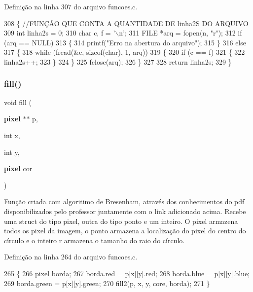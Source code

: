 Definição na linha 307 do arquivo funcoes.\+c.


\begin{DoxyCode}
308 \{ \textcolor{comment}{//FUNÇÃO QUE CONTA A QUANTIDADE DE linha2S DO ARQUIVO}
309     \textcolor{keywordtype}{int} linha2s = 0;
310     \textcolor{keywordtype}{char} c, f = \textcolor{charliteral}{'\(\backslash\)n'};
311     FILE *arq = fopen(n, \textcolor{stringliteral}{"r"});
312     \textcolor{keywordflow}{if} (arq == NULL)
313     \{
314         printf(\textcolor{stringliteral}{"Erro na abertura do arquivo"});
315     \}
316     \textcolor{keywordflow}{else}
317     \{
318         \textcolor{keywordflow}{while} (fread(&c, \textcolor{keyword}{sizeof}(\textcolor{keywordtype}{char}), 1, arq))
319         \{
320             \textcolor{keywordflow}{if} (c == f)
321             \{
322                 linha2s++;
323             \}
324         \}
325         fclose(arq);
326     \}
327 
328     \textcolor{keywordflow}{return} linha2s;
329 \}
\end{DoxyCode}
\mbox{\label{funcoes_8h_a0bd7c472a897af20e56c8d5483436282}} 
\subsubsection{fill()}
{\footnotesize\ttfamily void fill (\begin{DoxyParamCaption}\item[{\textbf{ pixel} $\ast$$\ast$}]{p,  }\item[{int}]{x,  }\item[{int}]{y,  }\item[{\textbf{ pixel}}]{cor }\end{DoxyParamCaption})}



Função criada com algoritimo de Bresenham, através dos conhecimentos do pdf disponibilizados pelo professor juntamente com o link adicionado acima. Recebe uma struct do tipo pixel, outra do tipo ponto e um inteiro. O pixel armazena todos os pixel da imagem, o ponto armazena a localização do pixel do centro do círculo e o inteiro r armazena o tamanho do raio do círculo. 



Definição na linha 264 do arquivo funcoes.\+c.


\begin{DoxyCode}
265 \{
266     pixel borda;
267     borda.red = p[x][y].red;
268     borda.blue = p[x][y].blue;
269     borda.green = p[x][y].green;
270     fill2(p, x, y, core, borda);
271 \}
\end{DoxyCode}
\mbox{\label{funcoes_8h_ac22fa8db2f2e7276a73a71694409531f}} 
